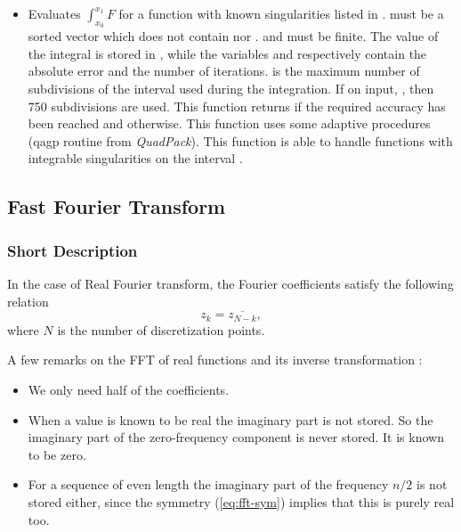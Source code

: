\begin{itemize}
\item {}
  \sshortdescribe Evaluates $\int_{x_0}^{x_1} F$  for a function
   with known singularities listed in .
   must be a sorted vector which does not contain 
  nor .   and  must be  finite. The value of the
  integral is stored in , while the variables  and
   respectively contain the absolute error and the number of
  iterations.  is the maximum number of subdivisions of the interval
   used during the integration. If on input, , then
  750 subdivisions are used.  This function returns  if the required
  accuracy has been reached and  otherwise. This function uses some
  adaptive procedures (qagp routine from {\it QuadPack}).  This function is
  able to handle functions  with integrable singularities on the interval
  \var{[x0,x1]}.
\end{itemize}


\subsection{Fast Fourier Transform}
\subsubsection{Short Description}

In the case of Real Fourier transform, the Fourier coefficients satisfy the
following relation
\begin{equation}
  \label{eq:fft-sym}
  z_k = \overline{z_{N-k}},
\end{equation}
where $N$ is the number of discretization points.

A few remarks on the FFT of real functions and its inverse transformation :
\begin{itemize}
\item We only need half of the coefficients.
\item When a value is known to be real the imaginary part is not stored.
  So the imaginary part of the zero-frequency component is never stored. It is
  known to be zero.
\item For a sequence of even length the imaginary part of the frequency
  $n/2$ is not stored either, since the symmetry (\ref{eq:fft-sym}) implies
  that this is purely real too.
\end{itemize}



